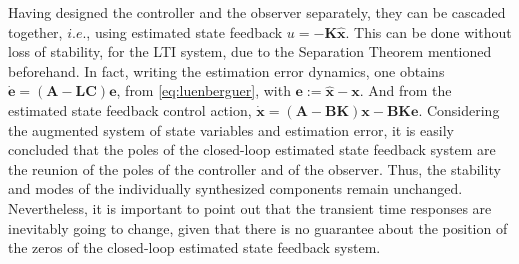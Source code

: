 \documentclass[letterpaper, 10 pt, conference]{ieeeconf}
\begin{document}
Having designed the controller and the observer separately, they can be cascaded together, $i.e.$, using estimated state feedback $u = -\mathbf{K\hat{x}}$. This can be done without loss of stability, for the LTI system, due to the Separation Theorem mentioned beforehand. In fact, writing the estimation error dynamics, one obtains $\dot{\mathbf{e}} = (\mathbf{A}-\mathbf{LC})\mathbf{e}$, from \eqref{eq:luenberguer}, with $\mathbf{e}:=\mathbf{\hat{x}}- \mathbf{x}$. And from the
estimated state feedback control action, $\dot{\mathbf{x}} = (\mathbf{A}-\mathbf{BK})\mathbf{x}-\mathbf{BKe}$. Considering the augmented system of state variables and estimation error, it is easily concluded that the poles of the closed-loop estimated state feedback system are the reunion of the poles of the controller and of the observer. Thus, the stability and modes of the individually synthesized components remain unchanged. Nevertheless, it is important to point out that the transient time responses are inevitably going to change, given that there is no guarantee about the position of the zeros of the closed-loop estimated state feedback system. 
\end{document}
